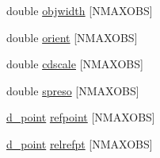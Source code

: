 \begin{DoxyCompactItemize}
\item 
double \hyperlink{structobjectobs_ad1db8049bb277b1fa78cd5608c635b7b}{objwidth} \mbox{[}NMAXOBS\mbox{]}
\item 
double \hyperlink{structobjectobs_ad3df027922ee6d3d6949d492db5294ca}{orient} \mbox{[}NMAXOBS\mbox{]}
\item 
double \hyperlink{structobjectobs_aa80cb10d92102ffc461b05d221b6d5e1}{cdscale} \mbox{[}NMAXOBS\mbox{]}
\item 
double \hyperlink{structobjectobs_ae0d5808e8f584f9bc7d7b19cb7e29b12}{spreso} \mbox{[}NMAXOBS\mbox{]}
\item 
\hyperlink{structd__point}{d\_\-point} \hyperlink{structobjectobs_a9d0e58fc0cfa8db58df692ecab128c5b}{refpoint} \mbox{[}NMAXOBS\mbox{]}
\item 
\hyperlink{structd__point}{d\_\-point} \hyperlink{structobjectobs_a7c36d05ed809499c5e4c2a82cf26b284}{relrefpt} \mbox{[}NMAXOBS\mbox{]}
\end{DoxyCompactItemize}


